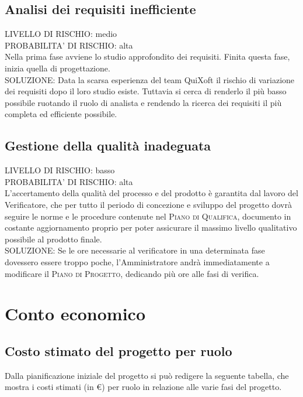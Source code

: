 \documentclass[11pt,a4paper]{article}
\begin{document}
\subsection{Analisi dei requisiti inefficiente}
LIVELLO DI RISCHIO: medio \\
PROBABILITA' DI RISCHIO: alta \\
Nella prima fase avviene lo studio approfondito dei requisiti.
Finita questa fase, inizia quella di progettazione. \\
SOLUZIONE: Data la scarsa esperienza del team QuiXoft il rischio di variazione dei requisiti dopo il loro studio esiste. Tuttavia si cerca di renderlo il più basso possibile ruotando il ruolo di analista e rendendo la ricerca dei requisiti il più completa ed efficiente possibile.
\subsection{Gestione della qualità inadeguata}
LIVELLO DI RISCHIO: basso \\
PROBABILITA' DI RISCHIO: alta \\
L'accertamento della qualità del processo e del prodotto è garantita dal lavoro del Verificatore, che per tutto il periodo di concezione e sviluppo del progetto dovrà seguire le norme e le procedure contenute nel \textsc{Piano di Qualifica}, documento in costante aggiornamento proprio per poter assicurare il massimo livello qualitativo possibile al prodotto finale. \\
SOLUZIONE: Se le ore necessarie al verificatore in una determinata fase dovessero essere troppo poche, l'Amministratore andrà immediatamente a modificare il \textsc{Piano di Progetto}, dedicando più ore alle fasi di verifica.
\section{Conto economico}
\subsection{Costo stimato del progetto per ruolo}
Dalla pianificazione iniziale del progetto si può redigere la seguente tabella, che mostra i costi stimati (in \euro) per ruolo in relazione alle varie fasi del progetto.
\end{document}

